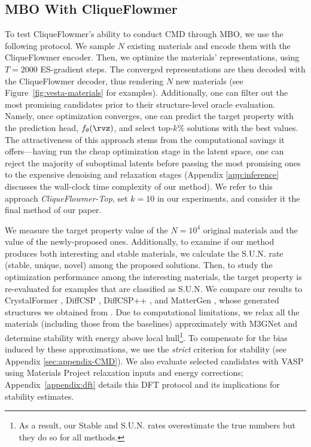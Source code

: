 \documentclass{article}
\theoremstyle{plain}
\theoremstyle{definition}
\theoremstyle{remark}
\begin{document}
\subsection{MBO With CliqueFlowmer}
\vspace{-5pt}
To test CliqueFlowmer's ability to conduct CMD through MBO, we use the following protocol. 
We sample $N$ existing materials and encode them with the CliqueFlowmer encoder. Then, we optimize the materials' representations, using $T=2000$ ES-gradient steps. 
The converged representations are then decoded with the CliqueFlowmer decoder, thus rendering $N$ new materials (see Figure~\ref{fig:vesta-materials} for examples).
Additionally, one can filter out the most promising candidates prior to their structure-level oracle evaluation.
Namely, once optimization converges, one can predict the target property with the prediction head, $f_{\theta}(\rvz)$, and select top-$k\%$ solutions with the best values. 
The attractiveness of this approach stems from the computational savings it offers---having run the cheap optimization stage in the latent space, one can reject the majority of suboptimal latents before passing the most promising ones to the expensive denoising and relaxation stages (Appendix \ref{app:inference} discusses the wall-clock time complexity of our method).
We refer to this approach \emph{CliqueFlowmer-Top}, set $k=10$ in our experiments, and consider it the final method of our paper.


We measure the target property value of the $N=10^4$ original materials and the value of the newly-proposed ones. 
Additionally, to examine if our method produces both interesting and stable materials, we calculate the S.U.N. rate (stable, unique, novel) \citep{zeni2023mattergen} among the proposed solutions. 
Then, to study the optimization performance among the interesting materials, the target property is re-evaluated for examples that are classified as S.U.N. 
We compare our results to CrystalFormer \citep{cao2025space}, DiffCSP \citep{jiao2023crystal}, DiffCSP++ \citep{jiao2024space}, and MatterGen \citep{zeni2023mattergen}, 
whose generated structures we obtained from \citet{kazeev2025generatedcrystals}.
Due to computational limitations, we relax all the materials (including those from the baselines) approximately with M3GNet \citep{chen2022universal} and determine stability with energy above local hull\footnote{As a result, our Stable and S.U.N. rates overestimate the true numbers but they do so for all methods.}.
To compensate for the bias induced by these approximations, we use the \emph{strict} criterion for stability (see Appendix \ref{sec:appendix-CMD}).
We also evaluate selected candidates with VASP using Materials Project relaxation inputs and energy corrections; Appendix~\ref{appendix:dft} details this DFT protocol and its implications for stability estimates. 
\end{document}

